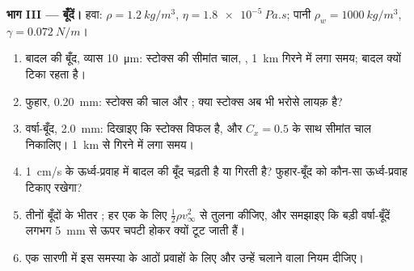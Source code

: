 \begin{problem}
\medskip
\noindent\textbf{भाग III --- बूँदें।}
हवा: $\rho = \qty{1.2}{kg/m^3}$, $\eta = \qty{1.8e-5}{Pa.s}$; पानी $\rho_w =
\qty{1000}{kg/m^3}$, $\gamma = \qty{0.072}{N/m}$।
\begin{enumerate}[resume]
  \item बादल की बूँद, व्यास \qty{10}{\micro m}: स्टोक्स की सीमांत चाल,
        , \qty{1}{km} गिरने में लगा समय; बादल क्यों टिका रहता है।
  \item फुहार, \qty{0.20}{mm}: स्टोक्स की चाल और ; क्या
        स्टोक्स अब भी भरोसे लायक़ है?
  \item वर्षा-बूँद, \qty{2.0}{mm}: दिखाइए कि स्टोक्स विफल है, और $C_x = 0.5$ के
        साथ सीमांत चाल निकालिए। \qty{1}{km} से गिरने में लगा समय।
  \item \qty{1}{cm/s} के ऊर्ध्व-प्रवाह में बादल की बूँद चढ़ती है या
        गिरती है? फुहार-बूँद को कौन-सा ऊर्ध्व-प्रवाह टिकाए रखेगा?
  \item तीनों बूँदों के भीतर ; हर एक के लिए
         $\tfrac12\rho v_\infty^2$ से तुलना कीजिए, और समझाइए कि
        बड़ी वर्षा-बूँदें लगभग \qty{5}{mm} से ऊपर चपटी होकर क्यों टूट जाती हैं।
  \item एक सारणी में इस समस्या के आठों प्रवाहों के लिए
         और उन्हें चलाने वाला नियम दीजिए।
\end{enumerate}
\end{problem}

